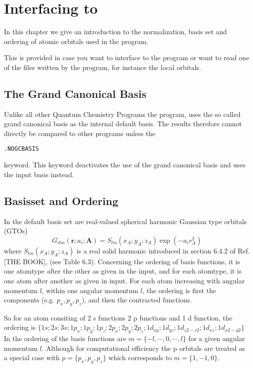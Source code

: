 \chapter{Interfacing to {\lsdalton}}\label{ch:starting}

In this chapter we give an introduction to the normalization, basis set and ordering of atomic orbitals used in the {\lsdalton} program. 

This is provided in case you want to interface to the {\lsdalton} program or want to read one of the files written by the {\lsdalton} program, for instance 
the local orbitals.
\section{The Grand Canonical Basis}

Unlike all other Quantum Chemistry Programs the {\lsdalton} program, uses the so called grand canonical basis as the internal default basis. The results therefore cannot directly be compared to other programs unless the 
\begin{verbatim}
.NOGCBASIS
\end{verbatim}
keyword. This keyword deactivates the use of the grand canonical basis and uses the input basis instead. 

\section{Basisset and Ordering}

In {\lsdalton} the default basis set are real-valued spherical harmonic Gaussian type
orbitals (GTOs)
\begin{equation}
G_{ilm}(\textbf{r}; a_{i};\textbf{A}) = S_{lm}(x_{A}; y_{A}; z_{A}) \exp(-a_{i}r^{2}_{A})
\end{equation}
where $S_{lm}(x_{A}; y_{A}; z_{A})$ is a real solid harmonic introduced in section 6.4.2 of Ref. [THE BOOK], (see Table 6.3).
Concerning the ordering of basis functions, it is one atomtype after the other as given
in the input, and for each atomtype, it is one atom after another as given in input. For
each atom increasing with angular momentum $l$, within one angular momentum $l$, the ordering 
is first the components (e.g. $p_{x},p_{y},p_{z}$), and then the contracted functions.



So for an atom consiting of 2 s functions 2 p functions and 1 d function, the ordering is
$\{1s; 2s; 3s; 1p_{x};1p_{y};1p_{z}; 2p_{x};2p_{y};2p_{z}; 1d_{xy}; 1d_{yz}; 1d_{z2-r2} ; 1d_{xz}; 1d_{x2-y2}\}$
In {\lsdalton} the ordering of the basis functions are $m = \{-l,\cdots,0,\cdots,l\}$ for a given
angular momentum $l$. Although for computational efficiency the p orbitals are treated as a
special case with $p = \{ p_{x},p_{y},p_{z} \}$ which corresponds to $m = \{1,-1,0 \}$.


